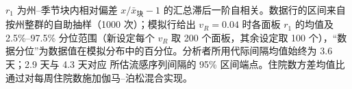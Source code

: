 \begin{table}[htbp]
\begin{tabular}{lllll}
\bottomrule
\end{tabular}
\par\smallskip
\begin{minipage}{0.95\linewidth}\scriptsize $r_1$ 为州--季节块内相对偏差 $x/\bar{x}_{\mathrm{块}}-1$ 的汇总滞后一阶自相关。数据行的区间来自按州整群的自助抽样（1000 次）；模拟行给出 $v_R=0.04$ 时各面板 $r_1$ 的均值及 2.5\%--97.5\% 分位范围（新设定每个 $v_R$ 取 200 个面板，其余设定取 100 个），“数据分位”为数据值在模拟分布中的百分位。分析者所用代际间隔均值始终为 3.6 天；2.9 天与 4.3 天对应 \citet{cowling2009estimation} 所估流感序列间隔的 95\% 区间端点。住院数方差均值比通过对每周住院数施加伽马--泊松混合实现。\end{minipage}
\end{table}
